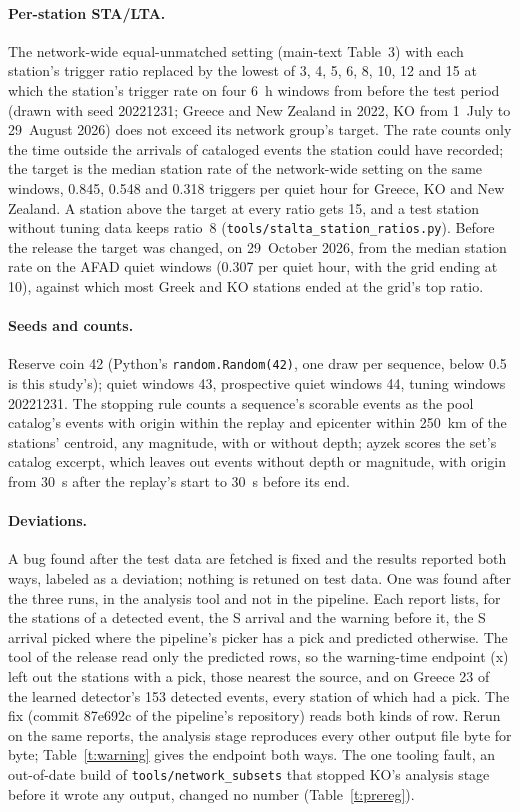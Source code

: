 \documentclass[11pt,a4paper]{article}
\newcommand{\stalta}{STA/LTA}
\newcommand{\tool}[1]{\nolinkurl{#1}}
\begin{document}
\paragraph{Per-station \stalta{}.} The network-wide equal-unmatched setting
(main-text Table~3) with each station's trigger ratio replaced by the lowest of 3, 4,
5, 6, 8, 10, 12 and 15 at which the station's trigger rate on four 6~h windows from
before the test period (drawn with seed 20221231; Greece and New Zealand in 2022, KO
from 1~July to 29~August 2026) does not exceed its network group's target. The rate
counts only the time outside the arrivals of cataloged events the station could have
recorded; the target is the median station rate of the network-wide setting on the
same windows, 0.845, 0.548 and 0.318 triggers per quiet hour for Greece, KO and New
Zealand. A station above the target at every ratio gets 15, and a test station
without tuning data keeps ratio~8 (\tool{tools/stalta\_station\_ratios.py}). Before
the release the target was changed, on 29~October 2026, from the median station rate
on the AFAD quiet windows (0.307 per quiet hour, with the grid ending at 10), against
which most Greek and KO stations ended at the grid's top ratio.

\paragraph{Seeds and counts.} Reserve coin 42 (Python's \tool{random.Random(42)}, one
draw per sequence, below 0.5 is this study's); quiet windows 43, prospective quiet
windows 44, tuning windows 20221231. The stopping rule counts a sequence's scorable
events as the pool catalog's events with origin within the replay and epicenter
within 250~km of the stations' centroid, any magnitude, with or without depth; ayzek
scores the set's catalog excerpt, which leaves out events without depth or magnitude,
with origin from 30~s after the replay's start to 30~s before its end.

\paragraph{Deviations.} A bug found after the test data are fetched is fixed and the
results reported both ways, labeled as a deviation; nothing is retuned on test data.
One was found after the three runs, in the analysis tool and not in the pipeline.
Each report lists, for the stations of a detected event, the S arrival and the warning
before it, the S arrival picked where the pipeline's picker has a pick and predicted
otherwise. The tool of the release read only the predicted rows, so the warning-time
endpoint (x) left out the stations with a pick, those nearest the source, and on
Greece 23 of the learned detector's 153 detected events, every station of which had a
pick. The fix (commit 87e692c of the pipeline's repository) reads both kinds of row.
Rerun on the same reports, the analysis stage reproduces every other output file byte
for byte; Table~\ref{t:warning} gives the endpoint both ways. The one tooling fault, an out-of-date build of \tool{tools/network\_subsets} that stopped KO's analysis stage before it wrote any output, changed no number (Table~\ref{t:prereg}).
\end{document}
